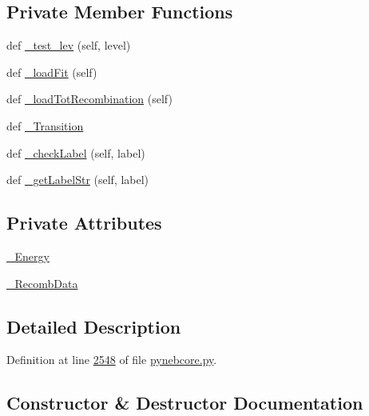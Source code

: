 \subsection*{Private Member Functions}
\begin{DoxyCompactItemize}
\item 
def \hyperlink{classpyneb_1_1core_1_1pynebcore_1_1_rec_atom_a271f5e8992df0412c6fdca611ac87a5d}{\+\_\+test\+\_\+lev} (self, level)
\item 
def \hyperlink{classpyneb_1_1core_1_1pynebcore_1_1_rec_atom_a84628ce75ecdf667d179df96ee287fa3}{\+\_\+load\+Fit} (self)
\item 
def \hyperlink{classpyneb_1_1core_1_1pynebcore_1_1_rec_atom_a17f0f264893dcd582bcf4f9a1befd8bc}{\+\_\+load\+Tot\+Recombination} (self)
\item 
def \hyperlink{classpyneb_1_1core_1_1pynebcore_1_1_rec_atom_a32b31a371f3b6ecc5bbbc4d0c5d2a855}{\+\_\+\+Transition}
\item 
def \hyperlink{classpyneb_1_1core_1_1pynebcore_1_1_rec_atom_adcc9c72bd96e9064b01591d8b32112ea}{\+\_\+check\+Label} (self, label)
\item 
def \hyperlink{classpyneb_1_1core_1_1pynebcore_1_1_rec_atom_ad235d43c967836595e501959f2c7c575}{\+\_\+get\+Label\+Str} (self, label)
\end{DoxyCompactItemize}
\subsection*{Private Attributes}
\begin{DoxyCompactItemize}
\item 
\hyperlink{classpyneb_1_1core_1_1pynebcore_1_1_rec_atom_a652daa9311973780fd44f61e09bc650f}{\+\_\+\+Energy}
\item 
\hyperlink{classpyneb_1_1core_1_1pynebcore_1_1_rec_atom_a1f483d9d99af479ef137489ccefe35e9}{\+\_\+\+Recomb\+Data}
\end{DoxyCompactItemize}


\subsection{Detailed Description}


Definition at line \hyperlink{pynebcore_8py_source_l02548}{2548} of file \hyperlink{pynebcore_8py_source}{pynebcore.\+py}.



\subsection{Constructor \& Destructor Documentation}
\hypertarget{classpyneb_1_1core_1_1pynebcore_1_1_rec_atom_abf13c53bf46bd7330bebd9397b4f8774}{}
